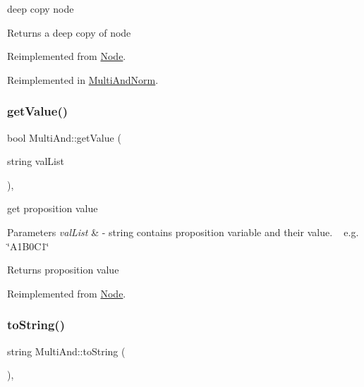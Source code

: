 deep copy node 

\begin{DoxyReturn}{Returns}
a deep copy of node 
\end{DoxyReturn}


Reimplemented from \hyperlink{class_node_a0d22a418a622a24852610fd51910c5eb}{Node}.



Reimplemented in \hyperlink{class_multi_and_norm_a77cbaf6920daa86d9ddc80b2a839a84f}{Multi\+And\+Norm}.

\mbox{\label{class_multi_and_a7730036f89cf27cddcf6d2efc293dd9d}} 
\subsubsection{\texorpdfstring{get\+Value()}{getValue()}}
{\footnotesize\ttfamily bool Multi\+And\+::get\+Value (\begin{DoxyParamCaption}\item[{string}]{val\+List }\end{DoxyParamCaption})\hspace{0.3cm}{\ttfamily [override]}, {\ttfamily [virtual]}}



get proposition value 


\begin{DoxyParams}{Parameters}
{\em val\+List} & -\/ string contains proposition variable and their value. ~\newline
 e.\+g. \char`\"{}\+A1\+B0\+C1\char`\"{} \\
\hline
\end{DoxyParams}
\begin{DoxyReturn}{Returns}
proposition value 
\end{DoxyReturn}


Reimplemented from \hyperlink{class_node_afd0c2045f3955e02e3aa1e2e987f10b2}{Node}.

\mbox{\label{class_multi_and_a035299de4f81beb44a9a5df63b0d5178}} 
\subsubsection{\texorpdfstring{to\+String()}{toString()}}
{\footnotesize\ttfamily string Multi\+And\+::to\+String (\begin{DoxyParamCaption}{ }\end{DoxyParamCaption})\hspace{0.3cm}{\ttfamily [override]}, {\ttfamily [virtual]}}



